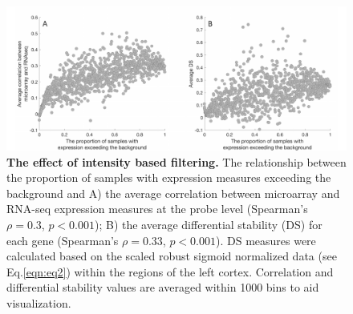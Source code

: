 \documentclass[10pt,A4]{article}
\begin{document}
\begin{figure}[h!]
  \centering
    \includegraphics[width=1\textwidth]{FigureS2.pdf}
\caption{\textbf{The effect of intensity based filtering.}
The relationship between the proportion of samples with expression measures exceeding the background and A) the average correlation between microarray and RNA-seq expression measures at the probe level (Spearman’s $\rho = 0.3$, $p<0.001$); B) the average differential stability (DS) for each gene (Spearman’s $\rho = 0.33$, $p<0.001$). DS measures were calculated based on the scaled robust sigmoid normalized data (see Eq.\ref{eqn:eq2}) within the regions of the left cortex. Correlation and differential stability values are averaged within 1000 bins to aid visualization.}
\label{fig:Ch4Sfig2}
\end{figure}
\end{document}
